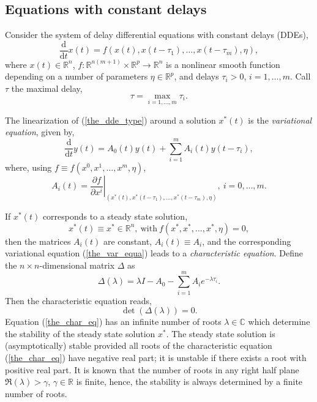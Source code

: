 \documentclass[10pt]{article}
\gdef \define#1{{\em{#1}}}
\gdef \d{{\mathrm d}}
\gdef \RR{{\mathbb R}}
\gdef \CC{{\mathbb C}}
\begin{document}
\subsection{Equations with constant delays}\label{dde}

Consider the system of delay differential equations with constant
delays (DDEs),
\begin{equation}\label{the_dde_type}
\frac{\d}{\d t}{x(t)}=f(x(t),x(t-\tau_1),\ldots,x(t-\tau_m),\eta),
\end{equation}
where $x(t)\in\RR^n$, $f:\RR^{n(m+1)}\times\RR^p
\rightarrow\RR^n$ is a nonlinear smooth function
depending on a number of parameters $\eta\in\RR^p$, and delays
$\tau_i>0$, $i=1,\ldots,m$.
Call $\tau$ the maximal delay,
\[
\tau=\max_{i=1,\ldots,m}\tau_i.
\]

The linearization of (\ref{the_dde_type}) around a solution $x^*(t)$ 
is the \define{variational equation}, given by,
\begin{equation}\label{the_var_equa}
\frac{\d}{\d t}{y(t)}=A_0(t)y(t)+\sum_{i=1}^m A_i(t)y(t-\tau_i),
\end{equation}
where, using $f\equiv f(x^0,x^1,\ldots,x^m,\eta)$,  
\begin{equation}\label{A_def}
A_i(t)=\left.\frac{\partial f}{\partial x^i}
\right|_{(x^*(t),x^*(t-\tau_1),\ldots,x^*(t-\tau_m),\eta)}, 
\ i=0,\ldots,m. 
\end{equation}

If $x^*(t)$ corresponds to a steady state solution,
\[
x^*(t)\equiv x^*\in\RR^n,\mathrm{\ with\ }f(x^*,x^*,\ldots,x^*,\eta)=0,
\]
then the matrices 
$A_i(t)$ are constant, $A_i(t)\equiv A_i$, and the corresponding 
variational equation (\ref{the_var_equa})
leads to a \define{characteristic equation}. Define the $n\times n$-dimensional
matrix $\Delta$ as
\[
\Delta(\lambda)=\lambda I - A_0 - \sum_{i=1}^m A_i e^{-\lambda\tau_i}.
\]
Then the characteristic equation reads,
\begin{equation}\label{the_char_eq}
\det(\Delta(\lambda))=0.
\end{equation}
Equation (\ref{the_char_eq}) has an infinite number of 
roots $\lambda\in\CC$ which determine the stability of the steady state
solution $x^*$.
The steady state solution is (asymptotically) stable provided all
roots of the characteristic equation (\ref{the_char_eq}) have
negative real part; it is unstable if there exists a root with positive
real part.
It is known that the number of roots in any right half plane
$\Re(\lambda)>\gamma$, $\gamma\in\RR$ is finite, hence, the
stability is always determined by a finite number of roots.
\end{document}
